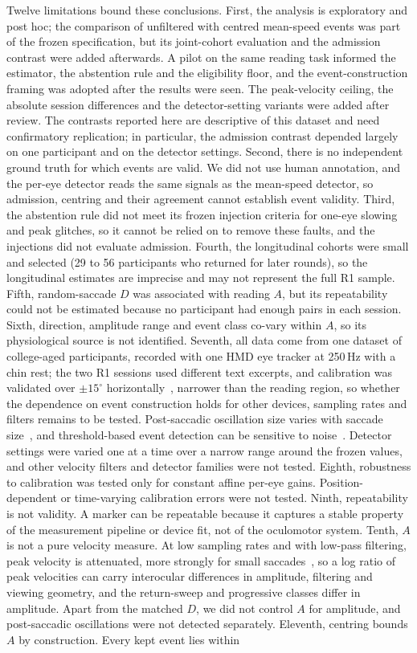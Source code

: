 Twelve limitations bound these conclusions. First, the analysis is exploratory and post hoc; the comparison of unfiltered with centred mean-speed events was part of the frozen specification, but its joint-cohort evaluation and the admission contrast were added afterwards. A pilot on the same reading task informed the estimator, the abstention rule and the eligibility floor, and the event-construction framing was adopted after the results were seen. The peak-velocity ceiling, the absolute session differences and the detector-setting variants were added after review. The contrasts reported here are descriptive of this dataset and need confirmatory replication; in particular, the admission contrast depended largely on one participant and on the detector settings. Second, there is no independent ground truth for which events are valid. We did not use human annotation, and the per-eye detector reads the same signals as the mean-speed detector, so admission, centring and their agreement cannot establish event validity. Third, the abstention rule did not meet its frozen injection criteria for one-eye slowing and peak glitches, so it cannot be relied on to remove these faults, and the injections did not evaluate admission. Fourth, the longitudinal cohorts were small and selected (29 to 56 participants who returned for later rounds), so the longitudinal estimates are imprecise and may not represent the full R1 sample. Fifth, random-saccade $D$ was associated with reading $A$, but its repeatability could not be estimated because no participant had enough pairs in each session. Sixth, direction, amplitude range and event class co-vary within $A$, so its physiological source is not identified. Seventh, all data come from one dataset of college-aged participants, recorded with one HMD eye tracker at 250\,Hz with a chin rest; the two R1 sessions used different text excerpts, and calibration was validated over $\pm 15^\circ$ horizontally~\citep{lohr2023}, narrower than the reading region, so whether the dependence on event construction holds for other devices, sampling rates and filters remains to be tested. Post-saccadic oscillation size varies with saccade size~\citep{hooge2015}, and threshold-based event detection can be sensitive to noise~\citep{ivtadapt2025}. Detector settings were varied one at a time over a narrow range around the frozen values, and other velocity filters and detector families were not tested. Eighth, robustness to calibration was tested only for constant affine per-eye gains. Position-dependent or time-varying calibration errors were not tested. Ninth, repeatability is not validity. A marker can be repeatable because it captures a stable property of the measurement pipeline or device fit, not of the oculomotor system. Tenth, $A$ is not a pure velocity measure. At low sampling rates and with low-pass filtering, peak velocity is attenuated, more strongly for small saccades~\citep{mack2017}, so a log ratio of peak velocities can carry interocular differences in amplitude, filtering and viewing geometry, and the return-sweep and progressive classes differ in amplitude. Apart from the matched $D$, we did not control $A$ for amplitude, and post-saccadic oscillations were not detected separately. Eleventh, centring bounds $A$ by construction. Every kept event lies within 